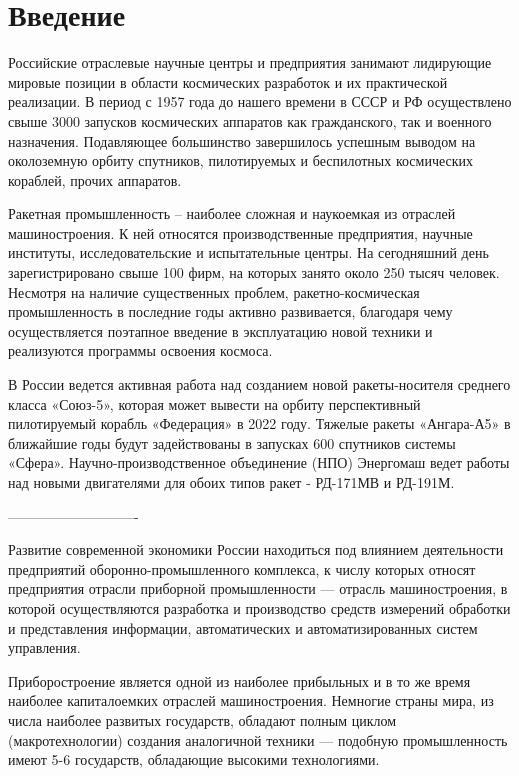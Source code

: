 \section{Введение}

Российские отраслевые научные центры и предприятия занимают лидирующие мировые позиции в области космических разработок и их практической реализации. В период с 1957 года до нашего времени в СССР и РФ осуществлено свыше 3000 запусков космических аппаратов как гражданского, так и военного назначения. Подавляющее большинство завершилось успешным выводом на околоземную орбиту спутников, пилотируемых и беспилотных космических кораблей, прочих аппаратов.

Ракетная промышленность – наиболее сложная и наукоемкая из отраслей машиностроения. К ней относятся производственные предприятия, научные институты, исследовательские и испытательные центры. На сегодняшний день зарегистрировано свыше 100 фирм, на которых занято около 250 тысяч человек. Несмотря на наличие существенных проблем, ракетно-космическая промышленность в последние годы активно развивается, благодаря чему осуществляется поэтапное введение в эксплуатацию новой техники и реализуются программы освоения космоса.

В России ведется активная работа над созданием новой ракеты-носителя среднего класса «Союз-5», которая может вывести на орбиту перспективный пилотируемый корабль «Федерация» в 2022 году. Тяжелые ракеты «Ангара-А5» в ближайшие годы будут задействованы в запусках 600 спутников системы «Сфера». Научно-производственное объединение (НПО) Энергомаш ведет работы над новыми двигателями для обоих типов ракет - РД-171МВ и РД-191М.

----------------------------

Развитие современной экономики России находиться под влиянием деятельности предприятий оборонно-промышленного комплекса, к числу которых относят предприятия отрасли приборной промышленности — отрасль машиностроения, в которой осуществляются разработка и производство средств измерений обработки и представления информации, автоматических и автоматизированных систем управления.

Приборостроение является одной из наиболее прибыльных и в то же время наиболее капиталоемких отраслей машиностроения. Немногие страны мира, из числа наиболее развитых государств, обладают полным циклом (макротехнологии) создания аналогичной техники — подобную промышленность имеют 5-6 государств, обладающие высокими технологиями.

